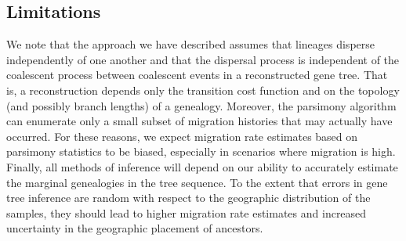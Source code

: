 

\subsection{Limitations}

We note that the approach we have described assumes that lineages disperse
independently of one another and that the dispersal process is independent of
the coalescent process between coalescent events in a reconstructed gene tree. 
That is, a reconstruction depends only the transition cost function and on the 
topology (and possibly branch lengths) of a genealogy. Moreover, the parsimony 
algorithm can enumerate only a small subset of migration histories that may 
actually have occurred. For these reasons, we expect migration rate estimates 
based on parsimony statistics to be biased, especially in scenarios where 
migration is high. Finally, all methods of inference will depend on our
ability to accurately estimate the marginal genealogies in the tree
sequence. To the extent that errors in gene tree inference are random with
respect to the geographic distribution of the samples, they should lead to
higher migration rate estimates and increased uncertainty in the geographic
placement of ancestors.



